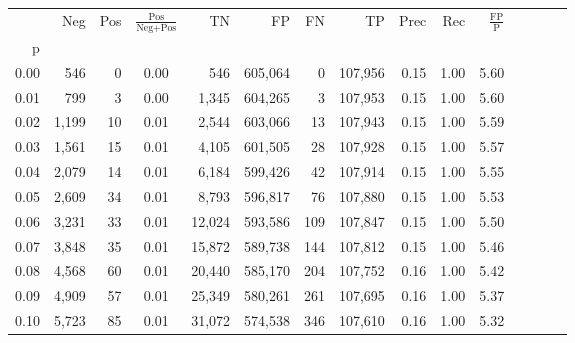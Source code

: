 \begin{tabular}{rrrcrrrrrrrrrrr}
\toprule
{} &     Neg &    Pos & $\frac{\text{Pos}}{\text{Neg}+\text{Pos}}$ &       TN &       FP &       FN &       TP &  Prec &   Rec & $\frac{\text{FP}}{\text{P}}$ \\
p    &         &        &                                            &          &          &          &          &       &       &                              \\
\midrule
0.00 &     546 &      0 &                                       0.00 &      546 &  605,064 &        0 &  107,956 &  0.15 &  1.00 &                         5.60 \\
0.01 &     799 &      3 &                                       0.00 &    1,345 &  604,265 &        3 &  107,953 &  0.15 &  1.00 &                         5.60 \\
0.02 &   1,199 &     10 &                                       0.01 &    2,544 &  603,066 &       13 &  107,943 &  0.15 &  1.00 &                         5.59 \\
0.03 &   1,561 &     15 &                                       0.01 &    4,105 &  601,505 &       28 &  107,928 &  0.15 &  1.00 &                         5.57 \\
0.04 &   2,079 &     14 &                                       0.01 &    6,184 &  599,426 &       42 &  107,914 &  0.15 &  1.00 &                         5.55 \\
0.05 &   2,609 &     34 &                                       0.01 &    8,793 &  596,817 &       76 &  107,880 &  0.15 &  1.00 &                         5.53 \\
0.06 &   3,231 &     33 &                                       0.01 &   12,024 &  593,586 &      109 &  107,847 &  0.15 &  1.00 &                         5.50 \\
0.07 &   3,848 &     35 &                                       0.01 &   15,872 &  589,738 &      144 &  107,812 &  0.15 &  1.00 &                         5.46 \\
0.08 &   4,568 &     60 &                                       0.01 &   20,440 &  585,170 &      204 &  107,752 &  0.16 &  1.00 &                         5.42 \\
0.09 &   4,909 &     57 &                                       0.01 &   25,349 &  580,261 &      261 &  107,695 &  0.16 &  1.00 &                         5.37 \\
0.10 &   5,723 &     85 &                                       0.01 &   31,072 &  574,538 &      346 &  107,610 &  0.16 &  1.00 &                         5.32 \\

\end{tabular}
